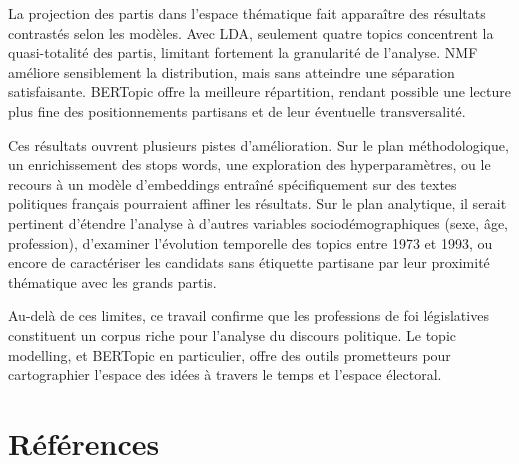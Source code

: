 \documentclass{article}
\begin{document}
La projection des partis dans l'espace thématique fait apparaître des résultats contrastés selon les modèles. Avec LDA, seulement quatre topics concentrent la quasi-totalité des partis, limitant fortement la granularité de l'analyse. NMF améliore sensiblement la distribution, mais sans atteindre une séparation satisfaisante. BERTopic offre la meilleure répartition, rendant possible une lecture plus fine des positionnements partisans et de leur éventuelle transversalité.

Ces résultats ouvrent plusieurs pistes d'amélioration. Sur le plan méthodologique, un enrichissement des stops words, une exploration des hyperparamètres, ou le recours à un modèle d'embeddings entraîné spécifiquement sur des textes politiques français pourraient affiner les résultats. Sur le plan analytique, il serait pertinent d'étendre l'analyse à d'autres variables sociodémographiques (sexe, âge, profession), d'examiner l'évolution temporelle des topics entre 1973 et 1993, ou encore de caractériser les candidats sans étiquette partisane par leur proximité thématique avec les grands partis.

Au-delà de ces limites, ce travail confirme que les professions de foi législatives constituent un corpus riche pour l'analyse du discours politique. Le topic modelling, et BERTopic en particulier, offre des outils prometteurs pour cartographier l'espace des idées à travers le temps et l'espace électoral.


\newpage
\section{Références}
\end{document}
